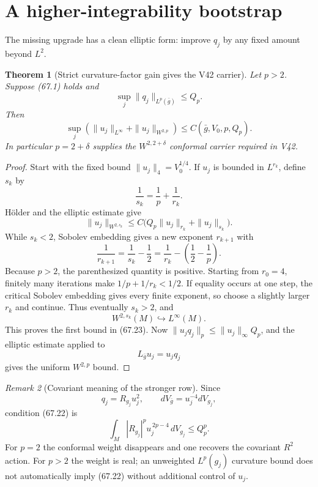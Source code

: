 \documentclass[11pt]{article}
\newtheorem{theorem}{Theorem}[section]
\theoremstyle{remark}
\newtheorem{remark}[theorem]{Remark}
\begin{document}
\section{A higher-integrability bootstrap}

The missing upgrade has a clean elliptic form: improve \(q_j\) by
any fixed amount beyond \(L^2\).

\begin{theorem}[Strict curvature-factor gain gives the V42 carrier]
\label{thm:v15v67-bootstrap}
Let \(p>2\).  Suppose (67.1) holds and
\[
 \sup_j\|q_j\|_{L^p(\bar g)}\leq Q_p.                 \tag{67.22}
\]
Then
\[
 \sup_j\left(
 \|u_j\|_{L^\infty}
 +\|u_j\|_{W^{2,p}}
 \right)
 \leq C(\bar g,V_0,p,Q_p).                            \tag{67.23}
\]
In particular \(p=2+\delta\) supplies the
\(W^{2,2+\delta}\) conformal carrier required in V42.
\end{theorem}

\begin{proof}
Start with the fixed bound \(\|u_j\|_4=V_0^{1/4}\).
If \(u_j\) is bounded in \(L^{r_k}\), define \(s_k\) by
\[
 \frac1{s_k}=\frac1p+\frac1{r_k}.                     \tag{67.24}
\]
H\"older and the elliptic estimate give
\[
 \|u_j\|_{W^{2,s_k}}
 \leq C\bigl(Q_p\|u_j\|_{r_k}+\|u_j\|_{s_k}\bigr).
                                                               \tag{67.25}
\]
While \(s_k<2\), Sobolev embedding gives a new exponent \(r_{k+1}\)
with
\[
 \frac1{r_{k+1}}
 =
 \frac1{s_k}-\frac12
 =
 \frac1{r_k}-\left(\frac12-\frac1p\right).             \tag{67.26}
\]
Because \(p>2\), the parenthesized quantity is positive.  Starting
from \(r_0=4\), finitely many iterations make
\(1/p+1/r_k<1/2\).  If equality occurs at one step, the critical
Sobolev embedding gives every finite exponent, so choose a slightly
larger \(r_k\) and continue.  Thus eventually \(s_k>2\), and
\[
 W^{2,s_k}(M)\hookrightarrow L^\infty(M).
\]
This proves the first bound in (67.23).  Now
\(\|u_jq_j\|_p\leq\|u_j\|_\infty Q_p\), and the elliptic estimate
applied to
\[
 L_{\bar g}u_j=u_jq_j
\]
gives the uniform \(W^{2,p}\) bound.
\end{proof}

\begin{remark}[Covariant meaning of the stronger row]
\label{rem:v15v67-weight}
Since
\[
 q_j=R_{g_j}u_j^2,\qquad dV_{\bar g}=u_j^{-4}dV_{g_j},
\]
condition (67.22) is
\[
 \int_M|R_{g_j}|^p u_j^{\,2p-4}\,dV_{g_j}\leq Q_p^p.  \tag{67.27}
\]
For \(p=2\) the conformal weight disappears and one recovers the
covariant \(R^2\) action.  For \(p>2\) the weight is real; an
unweighted \(L^p(g_j)\) curvature bound does not automatically
imply (67.22) without additional control of \(u_j\).
\end{remark}
\end{document}
